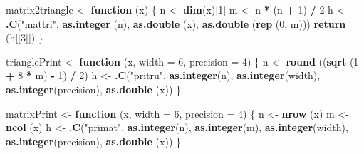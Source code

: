\documentclass[12pt,]{article}
\newenvironment{Shaded}{\begin{snugshade}}{\end{snugshade}}
\newcommand{\KeywordTok}[1]{\textcolor[rgb]{0.13,0.29,0.53}{\textbf{#1}}}
\newcommand{\DataTypeTok}[1]{\textcolor[rgb]{0.13,0.29,0.53}{#1}}
\newcommand{\DecValTok}[1]{\textcolor[rgb]{0.00,0.00,0.81}{#1}}
\newcommand{\StringTok}[1]{\textcolor[rgb]{0.31,0.60,0.02}{#1}}
\newcommand{\ControlFlowTok}[1]{\textcolor[rgb]{0.13,0.29,0.53}{\textbf{#1}}}
\newcommand{\OperatorTok}[1]{\textcolor[rgb]{0.81,0.36,0.00}{\textbf{#1}}}
\newcommand{\NormalTok}[1]{#1}
\begin{document}
\begin{Shaded}
\begin{Highlighting}[]
\NormalTok{matrix2triangle <-}\StringTok{ }\ControlFlowTok{function}\NormalTok{ (x) \{}
\NormalTok{  n <-}\StringTok{ }\KeywordTok{dim}\NormalTok{(x)[}\DecValTok{1}\NormalTok{]}
\NormalTok{  m <-}\StringTok{ }\NormalTok{n }\OperatorTok{*}\StringTok{ }\NormalTok{(n }\OperatorTok{+}\StringTok{ }\DecValTok{1}\NormalTok{) }\OperatorTok{/}\StringTok{ }\DecValTok{2}
\NormalTok{  h <-}
\StringTok{    }\KeywordTok{.C}\NormalTok{(}\StringTok{"mattri"}\NormalTok{, }\KeywordTok{as.integer}\NormalTok{ (n), }\KeywordTok{as.double}\NormalTok{ (x), }\KeywordTok{as.double}\NormalTok{ (}\KeywordTok{rep}\NormalTok{ (}\DecValTok{0}\NormalTok{, m)))}
  \KeywordTok{return}\NormalTok{ (h[[}\DecValTok{3}\NormalTok{]])}
\NormalTok{\}}

\NormalTok{trianglePrint <-}\StringTok{ }\ControlFlowTok{function}\NormalTok{ (x, }\DataTypeTok{width =} \DecValTok{6}\NormalTok{, }\DataTypeTok{precision =} \DecValTok{4}\NormalTok{) \{}
\NormalTok{  n <-}\StringTok{ }\KeywordTok{round}\NormalTok{ ((}\KeywordTok{sqrt}\NormalTok{ (}\DecValTok{1} \OperatorTok{+}\StringTok{ }\DecValTok{8} \OperatorTok{*}\StringTok{ }\NormalTok{m) }\OperatorTok{-}\StringTok{ }\DecValTok{1}\NormalTok{) }\OperatorTok{/}\StringTok{ }\DecValTok{2}\NormalTok{)}
\NormalTok{  h <-}\StringTok{ }\KeywordTok{.C}\NormalTok{(}\StringTok{"pritru"}\NormalTok{, }\KeywordTok{as.integer}\NormalTok{(n), }\KeywordTok{as.integer}\NormalTok{(width), }\KeywordTok{as.integer}\NormalTok{(precision), }\KeywordTok{as.double}\NormalTok{ (x))}
\NormalTok{\}}

\NormalTok{matrixPrint <-}\StringTok{ }\ControlFlowTok{function}\NormalTok{ (x, }\DataTypeTok{width =} \DecValTok{6}\NormalTok{, }\DataTypeTok{precision =} \DecValTok{4}\NormalTok{) \{}
\NormalTok{  n <-}\StringTok{ }\KeywordTok{nrow}\NormalTok{ (x)}
\NormalTok{  m <-}\StringTok{ }\KeywordTok{ncol}\NormalTok{ (x)}
\NormalTok{  h <-}\StringTok{ }\KeywordTok{.C}\NormalTok{(}\StringTok{"primat"}\NormalTok{, }\KeywordTok{as.integer}\NormalTok{(n), }\KeywordTok{as.integer}\NormalTok{(m), }\KeywordTok{as.integer}\NormalTok{(width), }\KeywordTok{as.integer}\NormalTok{(precision), }\KeywordTok{as.double}\NormalTok{ (x))}
\NormalTok{\}}


\end{Highlighting}
\end{Shaded}
\end{document}
